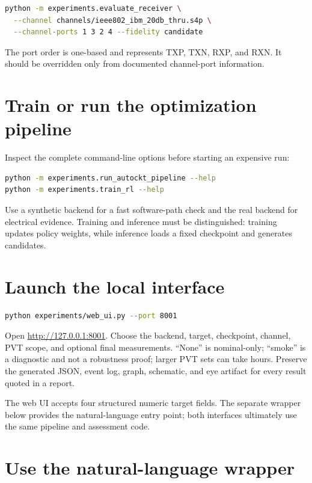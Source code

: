 \begin{lstlisting}[language=bash]
python -m experiments.evaluate_receiver \
  --channel channels/ieee802_ibm_20db_thru.s4p \
  --channel-ports 1 3 2 4 --fidelity candidate
\end{lstlisting}

The port order is one-based and represents TXP, TXN, RXP, and RXN. It should be
overridden only from documented channel-port information.

\section{Train or run the optimization pipeline}

Inspect the complete command-line options before starting an expensive run:

\begin{lstlisting}[language=bash]
python -m experiments.run_autockt_pipeline --help
python -m experiments.train_rl --help
\end{lstlisting}

Use a synthetic backend for a fast software-path check and the real backend for
electrical evidence. Training and inference must be distinguished: training
updates policy weights, while inference loads a fixed checkpoint and generates
candidates.

\section{Launch the local interface}

\begin{lstlisting}[language=bash]
python experiments/web_ui.py --port 8001
\end{lstlisting}

Open \url{http://127.0.0.1:8001}. Choose the backend, target, checkpoint,
channel, PVT scope, and optional final measurements. ``None'' is nominal-only;
``smoke'' is a diagnostic and not a robustness proof; larger PVT sets can take
hours. Preserve the generated JSON, event log, graph, schematic, and eye
artifact for every result quoted in a report.

The web UI accepts four structured numeric target fields. The separate wrapper
below provides the natural-language entry point; both interfaces ultimately use
the same pipeline and assessment code.

\section{Use the natural-language wrapper}

